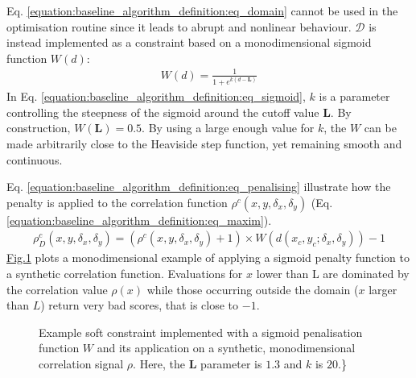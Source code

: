 \documentclass[letterpaper,10pt,english]{jupyterBook}
\begin{document}
\sphinxAtStartPar
Eq. \eqref{equation:baseline_algorithm_definition:eq_domain} cannot be used  in the optimisation routine since it leads to
abrupt and non\sphinxhyphen{}linear behaviour. \(\mathcal{D}\) is instead implemented as a  constraint based on a
mono\sphinxhyphen{}dimensional sigmoid function \(W(d)\):
\begin{equation}\label{equation:baseline_algorithm_definition:eq_sigmoid}
\begin{split}
W(d)   = \frac{1}{1 + e^{k(d - \mathbf{L})}} 
\end{split}
\end{equation}
\sphinxAtStartPar
In Eq. \eqref{equation:baseline_algorithm_definition:eq_sigmoid}, \(k\) is a parameter controlling the steepness
of the sigmoid around the cut\sphinxhyphen{}off value \(\mathbf{L}\). By construction,
\(W(\mathbf{L}) = 0.5\). By using a large enough value for \(k\), the \(W\)
can be made arbitrarily close to the Heaviside step function, yet
remaining smooth and continuous.

\sphinxAtStartPar
Eq. \eqref{equation:baseline_algorithm_definition:eq_penalising} illustrate how the penalty is applied to the correlation function
\(\rho^c(x,y,\delta_x,\delta_y)\) (Eq. \eqref{equation:baseline_algorithm_definition:eq_maxim}).
\begin{equation}\label{equation:baseline_algorithm_definition:eq_penalising}
\begin{split}
\rho^c_D(x,y,\delta_x,\delta_y) = (\rho^c(x,y,\delta_x,\delta_y) + 1) \times W(d(x_c,y_c;\delta_x,\delta_y)) - 1
\end{split}
\end{equation}
\sphinxAtStartPar
\hyperref[\detokenize{baseline_algorithm_definition:fig-sigmoids}]{Fig.\@ \ref{\detokenize{baseline_algorithm_definition:fig-sigmoids}}} plots a mono\sphinxhyphen{}dimensional example of applying a sigmoid penalty function
to a synthetic correlation function. Evaluations for \(x\) lower than L
are dominated by the correlation value \(\rho(x)\) while those occurring
outside the domain (\(x\) larger than \(L\)) return very bad scores, that is
close to \(-1\).

\begin{figure}[htbp]
\centering
\capstart

\noindent{}
\caption{Example soft constraint implemented with a sigmoid penalisation function \(W\) and its application on a synthetic,
mono\sphinxhyphen{}dimensional correlation signal \(\rho\). Here, the \(\mathbf{L}\) parameter is \(1.3\) and \(k\) is \(20\).\}}\label{\detokenize{baseline_algorithm_definition:fig-sigmoids}}\end{figure}
\end{document}
